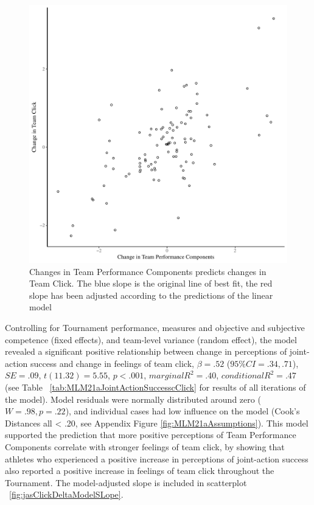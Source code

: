 \begin{CJK}{UTF8}{gbsn}
\begin{figure}[htbp]
  \centering
\includegraphics[scale=.5]{images/jasClickDeltaBasicXY}
  \caption{Changes in Team Performance Components predicts changes in Team Click. The blue slope is the original line of best fit, the red slope has been adjusted according to the predictions of the linear model}
  \label{fig:jasClickDeltaBasicXY}
\end{figure}

Controlling for Tournament performance, measures and objective and subjective competence (fixed effects), and team-level variance (random effect), the model revealed a significant positive relationship between change in perceptions of joint-action success and change in feelings of team click, $\beta = .52$ ($95\% CI =  .34, .71$), $SE = .09$, $t(11.32) = 5.55$, $p < .001$, $marginal R^2 = .40$, $conditional R^2 = .47$ (see Table ~\ref{tab:MLM21aJointActionSuccesscClick} for results of all iterations of the model).  Model residuals were normally distributed around zero ($W = .98, p = .22$), and individual cases had low influence on the model (Cook's Distances all < .20, see Appendix Figure \ref{fig:MLM21aAssumptions}).  This model supported the prediction that more positive perceptions of Team Performance Components correlate with stronger feelings of team click, by showing that athletes who experienced a positive increase in perceptions of joint-action success also reported a positive increase in feelings of team click throughout the Tournament.
The model-adjusted slope is included in scatterplot ~\ref{fig:jasClickDeltaModelSLope}.


\end{CJK}
